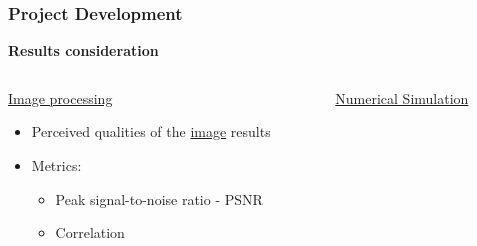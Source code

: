 \documentclass[18pt]{beamer}
\begin{document}
\begin{frame}[t]
  \frametitle{Project Development}
  \large{\textbf{Results consideration}}
  \vspace{-0.5cm}
  \begin{columns}[t]
    \begin{column}{0.5\textwidth}
      \begin{center}
        {\large \underline{Image processing}}
        \begin{itemize}
        \item Perceived qualities of the \underline{image} results
        \item Metrics:
          \begin{itemize}
          \item Peak signal-to-noise ratio - PSNR
          \item Correlation
          \end{itemize}
        \end{itemize}
      \end{center}
    \end{column}
    \begin{column}{0.5\textwidth}
      \begin{center}
        {\large \underline{Numerical Simulation}}
      \end{center}  
    \end{column}
  \end{columns}
\end{frame}
\end{document}
